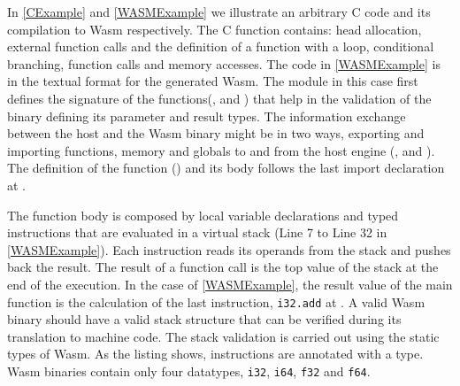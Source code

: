 In \autoref{CExample} and \autoref{WASMExample} we illustrate an arbitrary C code and its compilation to Wasm respectively. The C function contains: head allocation, external function calls and the definition of a function with a loop, conditional branching, function calls and memory accesses. The code in \autoref{WASMExample} is in the textual format for the generated Wasm. The module in this case first defines the signature of the functions(,   and  )  that help in the validation of the binary defining its parameter and result types. The information exchange between the host and the Wasm binary might be in two ways, exporting and importing functions, memory and globals to and from the host engine (,  and ). The definition of the function () and its body follows the last import declaration at . 

The function body is composed by local variable declarations and typed instructions that are evaluated in a virtual stack (Line 7 to Line 32 in \autoref{WASMExample}). Each instruction reads its operands from the stack and pushes back the result. The result of a function call is the top value of the stack at the end of the execution. In the case of \autoref{WASMExample}, the result value of the main function is the calculation of the last instruction, \texttt{i32.add} at . A valid Wasm binary should have a valid stack structure that can be verified during its translation to machine code. The stack validation is carried out using the static types of Wasm. 
As the listing shows, instructions are annotated with a type. Wasm binaries contain only four datatypes, \texttt{i32}, \texttt{i64}, \texttt{f32} and \texttt{f64}.

\begin{code}
    \begin{minipage}[t]{0.4\linewidth}

\end{minipage}\hspace{20mm}
\begin{minipage}[t]{0.4\linewidth}

%

\end{minipage}






\end{code}

